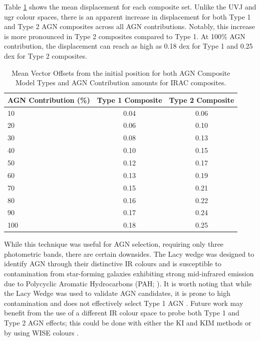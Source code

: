 \documentclass[
  journal=pasa,
  manuscript=research-paper,
  year=202X,
  volume=YY,
]{cup-journal}
\begin{document}
Table \ref{tab:irac_vectoroffset} shows the mean displacement for each composite set. Unlike the UVJ and ugr colour spaces, there is an apparent increase in displacement for both Type 1 and Type 2 AGN composites across all AGN contributions. Notably, this increase is more pronounced in Type 2 composites compared to Type 1. At 100\% AGN contribution, the displacement can reach as high as 0.18 dex for Type 1 and 0.25 dex for Type 2 composites.

\begin{table}[h!]
\begin{threeparttable}
\caption{Mean Vector Offsets from the initial position for both AGN Composite Model Types and AGN Contribution amounts for IRAC composites.}
\label{tab:irac_vectoroffset}
\begin{tabular}{lcc}
\toprule
\headrow AGN Contribution (\%) & Type 1 Composite & Type 2 Composite \\
\midrule
10  & 0.04 & 0.06 \\
20  & 0.06 & 0.10 \\
30  & 0.08 & 0.13 \\
40  & 0.10 & 0.15 \\
50  & 0.12 & 0.17 \\
60  & 0.13 & 0.19 \\
70  & 0.15 & 0.21 \\
80  & 0.16 & 0.22 \\
90  & 0.17 & 0.24 \\
100 & 0.18 & 0.25 \\
\bottomrule
\end{tabular}
\end{threeparttable}
\end{table}

While this technique was useful for AGN selection, requiring only three photometric bands, there are certain downsides. The Lacy wedge was designed to identify AGN through their distinctive IR colours and is susceptible to contamination from star-forming galaxies exhibiting strong mid-infrared emission due to Polycyclic Aromatic Hydrocarbons (PAH; \citealt{sajina_simulating_2005}). It is worth noting that while the Lacy Wedge was used to validate AGN candidates, it is prone to high contamination and does not effectively select Type 1 AGN \citep{donley_identifying_2012}. Future work may benefit from the use of a different IR colour space to probe both Type 1 and Type 2 AGN effects; this could be done with either the KI and KIM methods \citep{messias_new_2012, messias_dependency_2014} or by using WISE colours \citep{caccianiga_wise_2015}.
\end{document}
